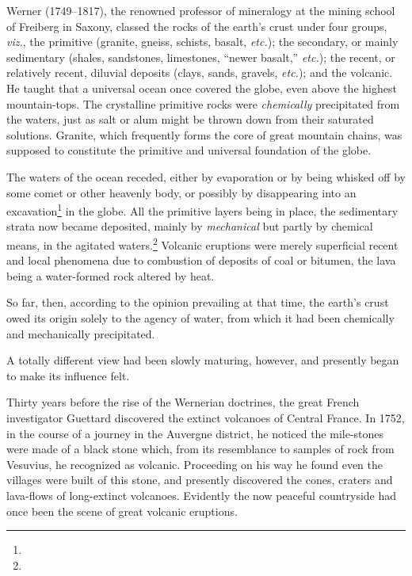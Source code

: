 \documentclass[a4paper, 12pt, oneside]{article}
\begin{document}
Werner (1749--1817), the renowned professor of mineralogy at the mining school of Freiberg in Saxony, classed the rocks of the earth's crust under four groups, \emph{viz.}, the primitive (granite, gneiss, schists, basalt, \emph{etc.}); the secondary, or mainly sedimentary (shales, sandstones, limestones, ``newer basalt,'' \emph{etc.}); the recent, or relatively recent, diluvial deposits (clays, sands, gravels, \emph{etc.}); and the volcanic. He taught that a universal ocean once covered the globe, even above the highest mountain-tops. The crystalline primitive rocks were \emph{chemically} precipitated from the waters, just as salt or alum might be thrown down from their saturated solutions. Granite, which frequently forms the core of great mountain chains, was supposed to constitute the primitive and universal foundation of the globe.

The waters of the ocean receded, either by evaporation or by being whisked off by some comet or other heavenly body, or possibly by disappearing into an excavation\footnote{} in the globe. All the primitive layers being in place, the sedimentary strata now became deposited, mainly by \emph{mechanical} but partly by chemical means, in the agitated waters.\footnote{} Volcanic eruptions were merely superficial recent and local phenomena due to combustion of deposits of coal or bitumen, the lava being a water-formed rock altered by heat.

So far, then, according to the opinion prevailing at that time, the earth's crust owed its origin solely to the agency of water, from which it had been chemically and mechanically precipitated.

A totally different view had been slowly maturing, however, and presently began to make its influence felt.

Thirty years before the rise of the Wernerian doctrines, the great French investigator Guettard discovered the extinct volcanoes of Central France. In 1752, in the course of a journey in the Auvergne district, he noticed the mile-stones were made of a black stone which, from its resemblance to samples of rock from Vesuvius, he recognized as volcanic. Proceeding on his way he found even the villages were built of this stone, and presently discovered the cones, craters and lava-flows of long-extinct volcanoes. Evidently the now peaceful countryside had once been the scene of great volcanic eruptions.
\end{document}
